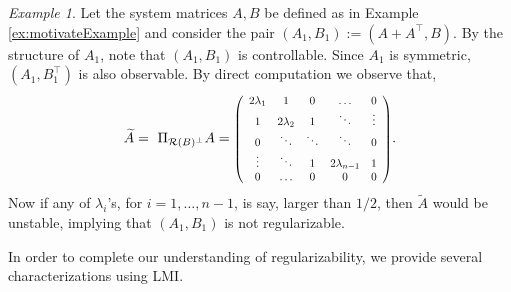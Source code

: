 \documentclass[journal]{IEEEtran}
\theoremstyle{definition}
\theoremstyle{remark}
\newtheorem{example}{Example}
\newcommand\scalemath[2]{\scalebox{#1}{\mbox{\ensuremath{\displaystyle #2}}}}
\begin{document}
    \begin{example}
        Let the system matrices $A,B$ be defined as in Example \ref{ex:motivateExample} and consider the pair $(A_1,B_1) := (A+A^\intercal, B)$.
        By the structure of $A_1$, note that $(A_1,B_1)$ is controllable.
        Since $A_1$ is symmetric, $(A_1,B_1^\intercal)$ is also observable. By direct computation we observe that,
        \begin{gather*}
             \widetilde{A} = ~\Pi_{\mathcal{R}(B)^\perp} A = \scalemath{0.8}{
    		\left(
    		\begin{array}{*5{c}}
    		2 \lambda_1    &     1    &    0      &  \hdots   &  0        \\
    		1           & 2 \lambda_2 &    1      &  \ddots          &  \vdots    \\
    		0           & \ddots         & \ddots &   \ddots   &  0        \\
    		 \vdots     &      \ddots     & 1   &  2 \lambda_{n-1}   &  1        \\
    		0           &  \hdots   &    0       &   0       & 0 \\
    		\end{array}
    		\right)}.
        \end{gather*}
    		Now if any of $\lambda_i$'s, for $i=1, \dots, n-1$, is say, larger than $1/2$, then $\widetilde{A}$ would be unstable, implying that $(A_1,B_1)$ is not  regularizable.
    \end{example}
    
    In order to complete our understanding of regularizability, we provide several characterizations using \ac{LMI}.
    
\end{document}
